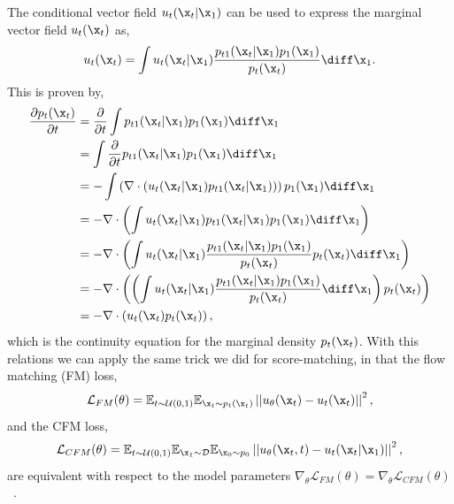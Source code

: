 The conditional vector field $u_t(\x_t | \x_1)$ can be used to express the marginal vector field $u_t(\x_t)$ as,
\begin{equation}
    \label{eq:conditional_to_marginal}
    u_t(\x_t) = \int u_t(\x_t | \x_1) \frac{p_{t1}(\x_t | \x_1) p_1(\x_1)}{p_t(\x_t)} \diff \x_1.
\end{equation}
This is proven by,
\begin{equation}
    \begin{aligned}
    \frac{\partial p_t(\x_t)}{\partial t}
    &= \frac{\partial}{\partial t} \int p_{t1}(\x_t | \x_1) p_1(\x_1) \diff \x_1 \\
    &= \int \frac{\partial}{\partial t} p_{t1}(\x_t | \x_1) p_1(\x_1) \diff \x_1 \\
    &= - \int \left(\nabla \cdot (u_t(\x_t | \x_1) p_{t1}(\x_t | \x_1))\right) p_1(\x_1) \diff \x_1 \\
    &= - \nabla \cdot \left(\int u_t(\x_t | \x_1) p_{t1}(\x_t | \x_1) p_1(\x_1) \diff \x_1\right) \\
    &= - \nabla \cdot \left(\int u_t(\x_t | \x_1) \frac{p_{t1}(\x_t | \x_1) p_1(\x_1)}{p_t(\x_t)} p_t(\x_t) \diff \x_1\right) \\
    &= - \nabla \cdot \left(\left(\int u_t(\x_t | \x_1) \frac{p_{t1}(\x_t | \x_1) p_1(\x_1)}{p_t(\x_t)} \diff \x_1\right) p_t(\x_t) \right) \\
    &= - \nabla \cdot \left(u_t(\x_t) p_t(\x_t)\right),
    \end{aligned}
\end{equation}
which is the continuity equation for the marginal density $p_t(\x_t)$.
With this relations we can apply the same trick we did for score-matching, in that the flow matching (FM) loss,
\begin{equation}
    \label{eq:fm_loss}
    \mathcal{L}_{FM}(\theta) =
    \mathbb{E}_{t \sim \timeone}
    \mathbb{E}_{\x_t \sim p_t(\x_t)}
    \left|\left|u_\theta(\x_t) - u_t(\x_t)\right|\right|^2,
\end{equation}
and the CFM loss,
\begin{equation}
    \label{eq:cfm_loss}
    \mathcal{L}_{CFM}(\theta) =
    \mathbb{E}_{t \sim \timeone}
    \mathbb{E}_{\x_1 \sim \mathcal{D}}
    \mathbb{E}_{\x_0 \sim p_0}
    \left|\left|u_\theta(\x_t, t) - u_t(\x_t | \x_1)\right|\right|^2,
\end{equation}
are equivalent with respect to the model parameters $\nabla_{\theta} \mathcal{L}_{FM}(\theta) = \nabla_{\theta} \mathcal{L}_{CFM}(\theta)$~\cite{FlowMatchingGenerative}.

